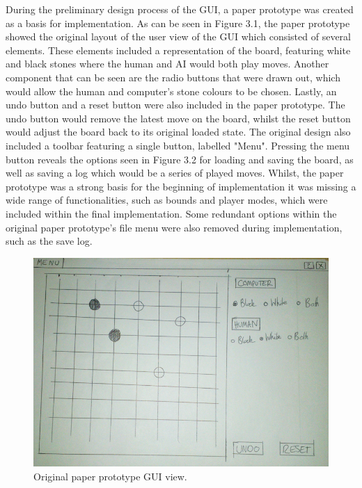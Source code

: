 \documentclass{l3proj}
\begin{document}
During the preliminary design process of the GUI, a paper prototype was created as a basis for implementation. As can be seen in Figure 3.1, the paper prototype showed the original layout of the user view of the GUI which consisted of several elements. These elements included a representation of the board, featuring white and black stones where the human and AI would both play moves. Another component that can be seen are the radio buttons that were drawn out, which would allow the human and computer's stone colours to be chosen. Lastly, an undo button and a reset button were also included in the paper prototype. The undo button would remove the latest move on the board, whilst the reset button would adjust the board back to its original loaded state. The original design also included a toolbar featuring a single button, labelled "Menu".  Pressing the menu button reveals the options seen in Figure 3.2 for loading and saving the board, as well as saving a log which would be a series of played moves. Whilst, the paper prototype was a strong basis for the beginning of implementation it was missing a wide range of functionalities, such as bounds and player modes, which were included within the final implementation. Some redundant options within the original paper prototype's file menu were also removed during implementation, such as the save log.

\begin{figure}[H]
\centering
\includegraphics[scale=0.4]{Images/GUI-1-PP.png}
\caption{Original paper prototype GUI view.}
\end{figure}
\end{document}
